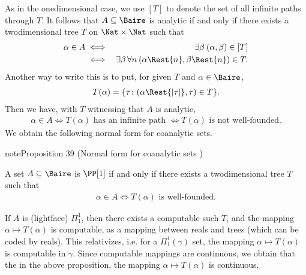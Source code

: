 \documentclass[letterpaper,10pt,english]{jupyterBook}
\begin{document}
\sphinxAtStartPar
As in the one\sphinxhyphen{}dimensional case, we use \([T]\) to denote the set of all infinite paths through \(T\). It follows that \(A \subseteq \Baire\) is analytic if and only if there exists a two\sphinxhyphen{}dimensional tree \(T\) on \(\Nat \times \Nat\) such that
\begin{eqnarray*}
	\alpha \in A & \iff & \exists \beta \: (\alpha,\beta) \in [T]\\
	             & \iff & \exists \beta \, \forall n \: (\alpha\Rest{n},\beta\Rest{n}) \in T.
\end{eqnarray*}
\sphinxAtStartPar
Another way to write this is to put, for given \(T\) and \(\alpha \in \Baire\),
\begin{equation*}
\begin{split}
	T(\alpha) = \{ \tau \colon (\alpha\Rest{|\tau|}, \tau) \in T \}.
\end{split}
\end{equation*}
\sphinxAtStartPar
Then we have, with \(T\) witnessing that \(A\) is analytic,
\begin{equation*}
\begin{split}
	\alpha \in A \iff T(\alpha) \text{ has an infinite path } \iff T(\alpha) \text{ is not well-founded}.
\end{split}
\end{equation*}
\sphinxAtStartPar
We obtain the following normal form for co\sphinxhyphen{}analytic sets.
\label{coanalytic:prop-norm-form-coanalytic}
\begin{sphinxadmonition}{note}{Proposition 39 (Normal form for co\sphinxhyphen{}analytic sets  )}



\sphinxAtStartPar
A set \(A \subseteq \Baire\) is \(\PP[1]\) if and only if there exists a two\sphinxhyphen{}dimensional tree \(T\) such that
\begin{equation*}
\begin{split}
    \alpha \in A \iff T(\alpha) \text{ is well-founded}.
\end{split}
\end{equation*}\end{sphinxadmonition}

\sphinxAtStartPar
If \(A\) is (lightface) \(\Pi^1_1\), then there exists a computable such \(T\), and the mapping \(\alpha \mapsto T(\alpha)\) is computable, as a mapping between reals and trees (which can be coded by reals). This relativizes, i.e. for a \(\Pi^1_1(\gamma)\) set, the mapping \(\alpha \mapsto T(\alpha)\) is computable in \(\gamma\). Since computable mappings are continuous, we obtain that the in the above proposition, the mapping \(\alpha \mapsto T(\alpha)\) is continuous.
\end{document}
